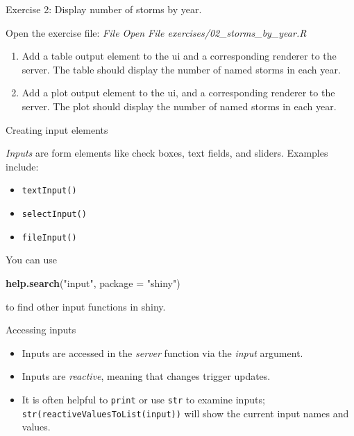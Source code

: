 \documentclass[
  12pt,
  ignorenonframetext,
]{beamer}
\newenvironment{Shaded}{\begin{snugshade}}{\end{snugshade}}
\newcommand{\DataTypeTok}[1]{\textcolor[rgb]{0.13,0.29,0.53}{#1}}
\newcommand{\KeywordTok}[1]{\textcolor[rgb]{0.13,0.29,0.53}{\textbf{#1}}}
\newcommand{\NormalTok}[1]{#1}
\newcommand{\StringTok}[1]{\textcolor[rgb]{0.31,0.60,0.02}{#1}}
\begin{document}
\begin{frame}{Exercise 2: Display number of storms by year.}
\protect\hypertarget{exercise-2-display-number-of-storms-by-year.}{}

Open the exercise file: \emph{File \rightarrow Open File
\rightarrow exercises/02\_storms\_by\_year.R}

\begin{enumerate}
\item
  Add a table output element to the ui and a corresponding renderer to
  the server. The table should display the number of named storms in
  each year.
\item
  Add a plot output element to the ui, and a corresponding renderer to
  the server. The plot should display the number of named storms in each
  year.
\end{enumerate}

\end{frame}

\begin{frame}[fragile]{Creating input elements}
\protect\hypertarget{creating-input-elements}{}

\emph{Inputs} are form elements like check boxes, text fields, and
sliders. Examples include:

\begin{itemize}
\item
  \texttt{textInput()}
\item
  \texttt{selectInput()}
\item
  \texttt{fileInput()}
\end{itemize}

You can use

\begin{Shaded}
\begin{Highlighting}[]
\KeywordTok{help.search}\NormalTok{(}\StringTok{"input"}\NormalTok{, }\DataTypeTok{package =} \StringTok{"shiny"}\NormalTok{)}
\end{Highlighting}
\end{Shaded}

to find other input functions in shiny.

\end{frame}

\begin{frame}[fragile]{Accessing inputs}
\protect\hypertarget{accessing-inputs}{}

\begin{itemize}
\item
  Inputs are accessed in the \emph{server} function via the \emph{input}
  argument.
\item
  Inputs are \emph{reactive}, meaning that changes trigger updates.
\item
  It is often helpful to \texttt{print} or use \texttt{str} to examine
  inputs; \texttt{str(reactiveValuesToList(input))} will show the
  current input names and values.
\end{itemize}

\end{frame}
\end{document}
